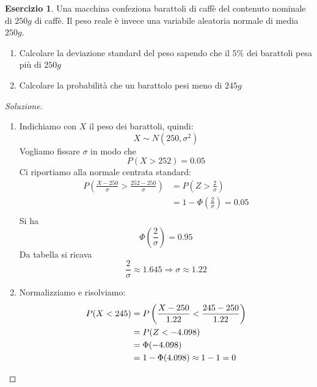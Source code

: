 \documentclass{article}
\theoremstyle{plain}
\theoremstyle{definition}
\newtheorem{esercizio}{Esercizio}[section]
\theoremstyle{remark}
\newenvironment{soluzione}
	{\renewcommand\qedsymbol{$\mathwitch*$}\begin{proof}[Soluzione]}
	{\end{proof}}
\renewcommand{\qedsymbol}{$\mathrightghost$}
\begin{document}
\begin{esercizio}
	Una macchina confeziona barattoli di caffè del contenuto nominale di $250g$ di caffè. Il peso reale è invece una variabile aleatoria normale di media $250g$.
	\begin{enumerate}
		\item Calcolare la deviazione standard del peso sapendo che il $5\%$ dei barattoli pesa più di $250g$
		\item Calcolare la probabilità che un barattolo pesi meno di $245g$
	\end{enumerate}
	\begin{soluzione}
		\begin{enumerate}
			\item Indichiamo con $X$ il peso dei barattoli, quindi:
			\begin{equation*}
				X\sim N(250, \sigma^2)
			\end{equation*}
			Vogliamo fissare $\sigma$ in modo che
			\begin{equation*}
				P(X>252)=0.05
			\end{equation*}
			Ci riportiamo alla normale centrata standard:
			\begin{align*}
				P\left(\frac{X-250}{\sigma}>\frac{252-250}{\sigma}\right)&=P\left(Z>\frac{2}{\sigma}\right)\\
				&=1-\Phi\left(\frac{2}{\sigma}\right)=0.05\\
			\end{align*}
			Si ha
			\begin{equation*}
				\Phi\left(\frac{2}{\sigma}\right)=0.95
			\end{equation*}
			Da tabella si ricava
			\begin{equation*}
				\frac{2}{\sigma}\approx1.645\Rightarrow \sigma\approx1.22
			\end{equation*}
			\item Normalizziamo e risolviamo:
			\begin{align*}
				P(X<245)&=P\left(\frac{X-250}{1.22}<\frac{245-250}{1.22}\right)\\
				&=P(Z<-4.098)\\
				&=\Phi(-4.098)\\
				&=1-\Phi(4.098)\approx1-1=0\qedhere
			\end{align*}
		\end{enumerate}
	\end{soluzione}
\end{esercizio}
\end{document}
